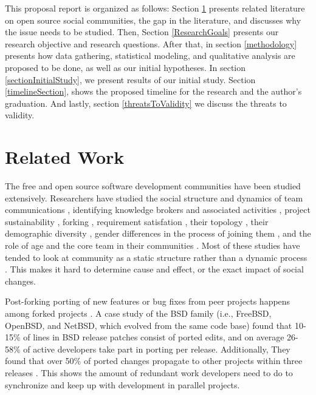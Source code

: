 \documentclass[11pt]{report}
\begin{document}
This proposal report is organized as follows: Section \ref{relatedwork} presents related literature on open source social communities, the gap in the literature, and discusses why the issue needs to be studied. 
Then, Section \ref{ResearchGoals} presents our research objective and research questions. After that, in section \ref{methodology} presents how data gathering, statistical modeling, and qualitative analysis are proposed to be done, as well as our initial hypotheses. In section \ref{sectionInitialStudy}, we present results of our initial study. Section \ref{timelineSection}, shows the proposed timeline for the research and the author's graduation. And lastly, section \ref{threatsToValidity} we discuss the threats to validity.\\
\pagebreak

\section{Related Work}
\label{relatedwork}

The free and open source software development communities have been studied extensively. Researchers have studied the social structure and dynamics of team communications \cite{Bird}\cite{Guzzi}\cite{HowisonSocialDynamics}\cite{HowisonFlossMole}\cite{Nakakoji}, identifying knowledge brokers and associated activities \cite{Sowe}, project sustainability \cite{Nakakoji}\cite{NymanForkingSustainability}, forking \cite{NymanCodeForking}, requirement satisfation \cite{Ernst}, their topology \cite{Bird}, their demographic diversity \cite{Kunegis}, gender differences in the process of joining them \cite{Kuechler}, and the role of age and the core team in their communities \cite{AzarbakhtOSS2014}\cite{AzarbakhtINSNA2014}\cite{DavidsonVLHCC2014}\cite{Torres}. Most of these studies have tended to look at community as a static structure rather than a dynamic process \cite{CrowstonFLOSSWhatWeKnow}. This makes it hard to determine cause and effect, or the exact impact of social changes.

Post-forking porting of new features or bug fixes from peer projects happens among forked projects \cite{Baishakhi}. A case study of the BSD family (i.e., FreeBSD, OpenBSD, and NetBSD, which evolved from the same code base) found that 10-15\% of lines in BSD release patches consist of ported edits, and on average 26-58\% of active developers take part in porting per release. Additionally, They found that over 50\% of ported changes propagate to other projects within three releases \cite{Baishakhi}. This shows the amount of redundant work developers need to do to synchronize and keep up with development in parallel projects. 
\end{document}
